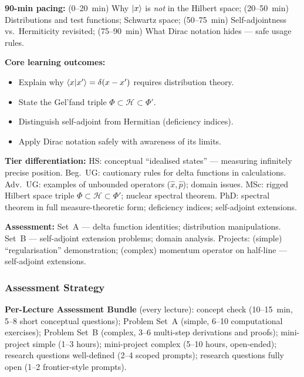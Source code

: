 \documentclass[11pt,a4paper]{article}
\begin{document}
\medskip
\begin{tcolorbox}[modulebox, title={Module~I.2 --- Lecture L12: Rigged Hilbert Spaces \& Mathematical Foundations}]
\textbf{90-min pacing:} (0--20~min) Why $\ket{x}$ is \emph{not} in the Hilbert space;
(20--50~min) Distributions and test functions; Schwartz space;
(50--75~min) Self-adjointness vs.\ Hermiticity revisited;
(75--90~min) What Dirac notation hides --- safe usage rules.

\medskip\textbf{Core learning outcomes:}
\begin{itemize}[leftmargin=1.4em,topsep=2pt,itemsep=1pt]
  \item Explain why $\braket{x|x'}=\delta(x-x')$ requires distribution theory.
  \item State the Gel'fand triple $\Phi\subset\mathcal{H}\subset\Phi'$.
  \item Distinguish self-adjoint from Hermitian (deficiency indices).
  \item Apply Dirac notation safely with awareness of its limits.
\end{itemize}

\medskip\textbf{Tier differentiation:}
HS: conceptual ``idealised states'' --- measuring infinitely precise position.
Beg.\ UG: cautionary rules for delta functions in calculations.
Adv.\ UG: examples of unbounded operators ($\hat{x},\hat{p}$); domain issues.
MSc: rigged Hilbert space triple $\Phi\subset\mathcal{H}\subset\Phi'$; nuclear spectral theorem.
PhD: spectral theorem in full measure-theoretic form; deficiency indices; self-adjoint extensions.

\medskip\textbf{Assessment:}
Set~A --- delta function identities; distribution manipulations.
Set~B --- self-adjoint extension problems; domain analysis.
Projects: (simple) ``regularisation'' demonstration; (complex) momentum operator on half-line --- self-adjoint extensions.
\end{tcolorbox}

\subsubsection*{Assessment Strategy}
\label{sec:braket-assessment}

\begin{tcolorbox}[highlightbox]
\textbf{Per-Lecture Assessment Bundle} (every lecture):
concept check (10--15~min, 5--8 short conceptual questions);
Problem Set~A (simple, 6--10 computational exercises);
Problem Set~B (complex, 3--6 multi-step derivations and proofs);
mini-project simple (1--3 hours);
mini-project complex (5--10 hours, open-ended);
research questions well-defined (2--4 scoped prompts);
research questions fully open (1--2 frontier-style prompts).
\end{tcolorbox}
\end{document}
